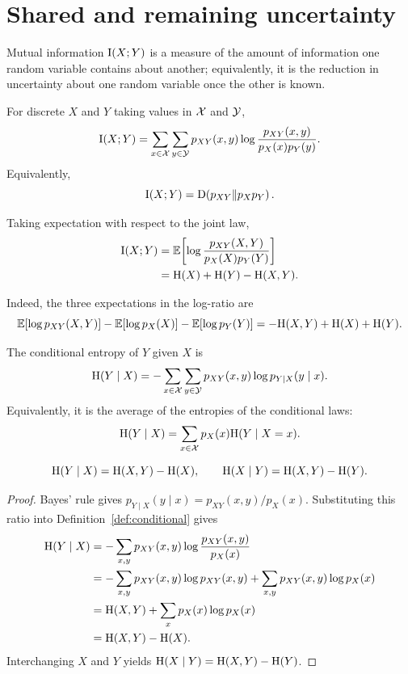 \section{Shared and remaining uncertainty}\label{sec:mutual}
\quad{}

\begin{strand}
Mutual information $\mathrm{I}(X;Y)$ is a measure of the amount of information one
random variable contains about another; equivalently, it is the reduction in
uncertainty about one random variable once the other is known.
\end{strand}

\begin{definition}\label{def:mi}
For discrete $X$ and $Y$ taking values in $\mathcal{X}$ and $\mathcal{Y}$,
\[
  \mathrm{I}(X;Y)
  =\sum_{x\in\mathcal{X}}\sum_{y\in\mathcal{Y}}
   p_{XY}(x,y)\log\frac{p_{XY}(x,y)}{p_X(x)p_Y(y)}.
\]
Equivalently,
\[
  \mathrm{I}(X;Y)=\mathrm{D}\!\left(p_{XY}\Vert p_Xp_Y\right).
\]
\end{definition}

Taking expectation with respect to the joint law,
\begin{align*}
  \mathrm{I}(X;Y)
  &=\mathbb{E}\!\left[\log\frac{p_{XY}(X,Y)}{p_X(X)p_Y(Y)}\right]\\
  &=\mathrm{H}(X)+\mathrm{H}(Y)-\mathrm{H}(X,Y).
\end{align*}

Indeed, the three expectations in the log-ratio are
\[
  \mathbb{E}[\log p_{XY}(X,Y)]
  -\mathbb{E}[\log p_X(X)]
  -\mathbb{E}[\log p_Y(Y)]
  =-\mathrm{H}(X,Y)+\mathrm{H}(X)+\mathrm{H}(Y).
\]


\begin{definition}\label{def:conditional}
The conditional entropy of $Y$ given $X$ is
\[
  \mathrm{H}(Y\mid X)
  =-\sum_{x\in\mathcal{X}}\sum_{y\in\mathcal{Y}}
    p_{XY}(x,y)\log p_{Y\mid X}(y\mid x).
\]
Equivalently, it is the average of the entropies of the conditional laws:
\[
  \mathrm{H}(Y\mid X)
  =\sum_{x\in\mathcal{X}}p_X(x)\mathrm{H}(Y\mid X=x).
\]
\end{definition}

\begin{proposition}\label{prop:chain}
\[
  \mathrm{H}(Y\mid X)=\mathrm{H}(X,Y)-\mathrm{H}(X),
  \qquad
  \mathrm{H}(X\mid Y)=\mathrm{H}(X,Y)-\mathrm{H}(Y).
\]
\end{proposition}
\begin{proof}
Bayes' rule gives
$p_{Y\mid X}(y\mid x)=p_{XY}(x,y)/p_X(x)$.
Substituting this ratio into Definition~\ref{def:conditional} gives
\begin{align*}
  \mathrm{H}(Y\mid X)
  &=-\sum_{x,y}p_{XY}(x,y)
    \log\frac{p_{XY}(x,y)}{p_X(x)}\\
  &=-\sum_{x,y}p_{XY}(x,y)\log p_{XY}(x,y)
    +\sum_{x,y}p_{XY}(x,y)\log p_X(x)\\
  &=\mathrm{H}(X,Y)+\sum_xp_X(x)\log p_X(x)\\
  &=\mathrm{H}(X,Y)-\mathrm{H}(X).
\end{align*}
Interchanging $X$ and $Y$ yields
$\mathrm{H}(X\mid Y)=\mathrm{H}(X,Y)-\mathrm{H}(Y)$.
\end{proof}

